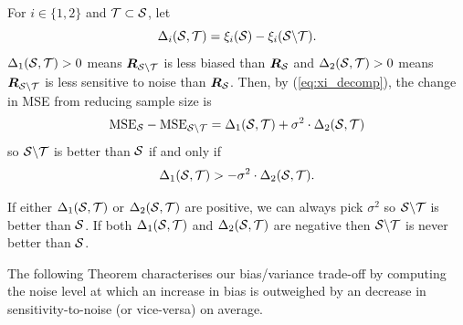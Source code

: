 \noindent For $i \in \{1,2\}$ and $\mathcal{T}\subset \mathcal{S}$, let
\begin{equation}
    \Delta_i(\mathcal{S}, \mathcal{T}) = \xi_{i}(\mathcal{S}) - \xi_{i}(\mathcal{S} \backslash \mathcal{T}). 
\end{equation}
$\Delta_{1}(\mathcal{S},\mathcal{T}) > 0$ means $\bm{R}_{\mathcal{S}\backslash \mathcal{T}}$ is less biased than $\bm{R}_{\mathcal{S}}$ and $\Delta_{2}(\mathcal{S},\mathcal{T}) > 0$ means $\bm{R}_{\mathcal{S}\backslash \mathcal{T}}$ is less sensitive to noise than $\bm{R}_{\mathcal{S}}$.
Then, by (\ref{eq:xi_decomp}), the change in MSE from reducing sample size is 
\begin{equation}
    \text{MSE}_{\mathcal{S}} - \text{MSE}_{\mathcal{S} \backslash \mathcal{T} }
    = \Delta_{1}(\mathcal{S},\mathcal{T}) + \sigma^{2} \cdot \Delta_{2}(\mathcal{S},\mathcal{T}) \label{eq:EMSE_decomp_into_delta}
\end{equation}
so $\mathcal{S} \backslash \mathcal{T}$ is better than $\mathcal{S}$ if and only if
\begin{equation}
    \Delta_{1}(\mathcal{S},\mathcal{T}) > - \sigma^{2} \cdot \Delta_{2}(\mathcal{S},\mathcal{T}). \label{eq:general:better_xi_ineq}
\end{equation}
\begin{remark}
 If either $\Delta_{1}(\mathcal{S},\mathcal{T})$ or $\Delta_{2}(\mathcal{S},\mathcal{T})$ are positive, we can always pick $\sigma^{2}$ so $\mathcal{S} \backslash \mathcal{T}$ is better than $\mathcal{S}$. If both $\Delta_{1}(\mathcal{S},\mathcal{T})$ and $\Delta_{2}(\mathcal{S},\mathcal{T})$ are negative then  $\mathcal{S} \backslash \mathcal{T}$ is never better than $\mathcal{S}$.   
\end{remark}

The following Theorem characterises our bias/variance trade-off by computing the noise level at which an increase in bias is outweighed by an decrease in sensitivity-to-noise (or vice-versa) on average.

